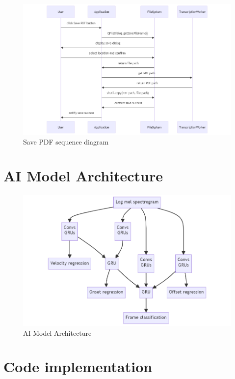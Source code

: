 \documentclass{article}
\begin{document}
\begin{figure}[htbp]
    \centering
    \includegraphics[width=\textwidth]{../diagrams/save_pdf_seq.png}
    \caption{Save PDF sequence diagram}
    \label{fig:save_pdf_sequence_diagram}
\end{figure}

\FloatBarrier
\clearpage

\section{AI Model Architecture}
\begin{figure}[htbp]
    \centering
    \includegraphics[width=\textwidth]{../diagrams/ai_architecture.png}
    \caption{AI Model Architecture}
    \label{fig:ai_model_architecture}
\end{figure}

\section{Code implementation}
\end{document}
